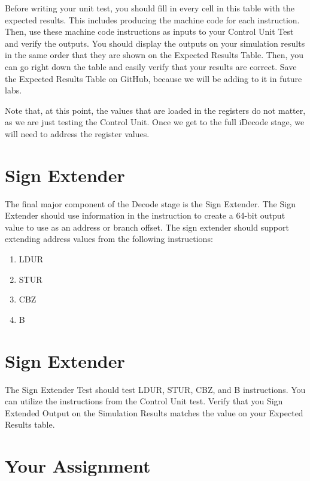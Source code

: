 Before writing your unit test, you should fill in every cell in this table with the expected results.  This includes producing the machine code for each instruction.  Then, use these machine code instructions as inputs to your Control Unit Test and verify the outputs.  You should display the outputs on your simulation results in the same order that they are shown on the Expected Results Table.  Then, you can go right down the table and easily verify that your results are correct.  Save the Expected Results Table on GitHub, because we will be adding to it in future labs.

Note that, at this point, the values that are loaded in the registers do not matter, as we are just testing the Control Unit.  Once we get to the full iDecode stage, we will need to address the register values.

\section{Sign Extender}
The final major component of the Decode stage is the Sign Extender.  The Sign Extender should use information in the instruction to create a 64-bit output value to use as an address or branch offset.  The sign extender should support extending address values from the following instructions:
\begin{enumerate}
	\item LDUR
	\item STUR
	\item CBZ
	\item B
\end{enumerate}

\section{Sign Extender}
The Sign Extender Test should test LDUR, STUR, CBZ, and B instructions.  You can utilize the instructions from the Control Unit test.  Verify that you Sign Extended Output on the Simulation Results matches the value on your Expected Results table.

\clearpage
\section{Your Assignment}

